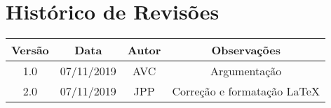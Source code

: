 \chapter*{\centering Histórico de Revisões}

\begin{center}
    \begin{tabular}{|c|c|c|c|}
        \hline
        Versão & Data       & Autor & Observações                                      \\
        \hline
        1.0    & 07/11/2019 & AVC   & Argumentação                                  \\
        \hline
        2.0    & 07/11/2019 & JPP   & Correção e formatação \LaTeX                                 \\
        \hline
    \end{tabular}
\end{center}
